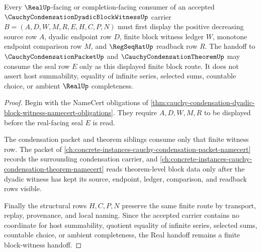 \begin{theorem}
\label{thm:cauchy-condensation-dyadic-block-witness-real-handoff}
Every $\RealUp$-facing or completion-facing consumer of an accepted $\CauchyCondensationDyadicBlockWitnessUp$ carrier $B=(A,D,W,M,R,E,H,C,P,N)$ must first display the positive decreasing source row $A$, dyadic endpoint row $D$, finite block witness ledger $W$, monotone endpoint comparison row $M$, and $\RegSeqRatUp$ readback row $R$. The handoff to $\CauchyCondensationPacketUp$ and $\CauchyCondensationTheoremUp$ may consume the seal row $E$ only as this displayed finite block route. It does not assert host summability, equality of infinite series, selected sums, countable choice, or ambient $\RealUp$ completeness.
\end{theorem}
\begin{proof}
Begin with the NameCert obligations of \autoref{thm:cauchy-condensation-dyadic-block-witness-namecert-obligations}. They require $A,D,W,M,R$ to be displayed before the real-facing seal $E$ is read.

The condensation packet and theorem siblings consume only that finite witness row. The packet of \autoref{ch:concrete-instances-cauchy-condensation-packet-namecert} records the surrounding condensation carrier, and \autoref{ch:concrete-instances-cauchy-condensation-theorem-namecert} reads theorem-level block data only after the dyadic witness has kept its source, endpoint, ledger, comparison, and readback rows visible.

Finally the structural rows $H,C,P,N$ preserve the same finite route by transport, replay, provenance, and local naming. Since the accepted carrier contains no coordinate for host summability, quotient equality of infinite series, selected sums, countable choice, or ambient completeness, the Real handoff remains a finite block-witness handoff.
\end{proof}

